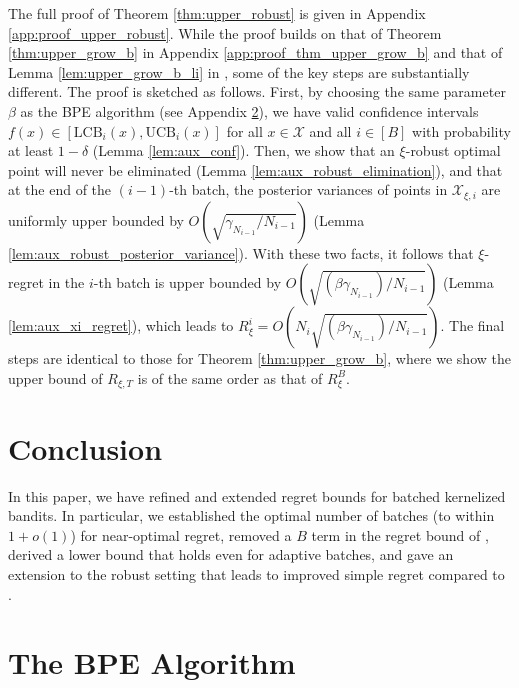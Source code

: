 \documentclass[10pt]{article}
\begin{document}
The full proof of Theorem \ref{thm:upper_robust} is given in Appendix \ref{app:proof_upper_robust}. While the proof builds on that of Theorem \ref{thm:upper_grow_b} in Appendix \ref{app:proof_thm_upper_grow_b} and that of Lemma \ref{lem:upper_grow_b_li} in \citep{Li22}, some of the key steps are substantially different.
The proof is sketched as follows.
First, by choosing the same parameter $\beta$ as the BPE algorithm (see Appendix \ref{app:bpe}),
we have valid confidence intervals $f(x)\in[\mathrm{LCB}_i(x),\mathrm{UCB}_i(x)]$ for all $x\in \mathcal{X}$ and all $i\in[B]$ with probability at least $1-\delta$ (Lemma \ref{lem:aux_conf}).
Then, we show that an $\xi$-robust optimal point will never be eliminated (Lemma \ref{lem:aux_robust_elimination}), and that at the end of the $(i-1)$-th batch, the posterior variances of points in $\mathcal{X}_{\xi, i}$ are uniformly upper bounded by $O(\sqrt{\gamma_{N_{i-1}}/N_{i-1}})$ (Lemma \ref{lem:aux_robust_posterior_variance}). 
With these two facts, it follows that $\xi$-regret in the $i$-th batch is upper bounded by $O(\sqrt{(\beta \gamma_{N_{i-1}})/ N_{i-1} } )$ (Lemma \ref{lem:aux_xi_regret}), which leads to $R_{\xi}^i= O (N_{i}\sqrt{(\beta \gamma_{N_{i-1}})/ N_{i-1} } ) $. 
The final steps are identical to those for Theorem \ref{thm:upper_grow_b}, where we show 
the upper bound of $R_{\xi,T}$ is of the same order as that of $R_{\xi}^B$.

\section{Conclusion}
In this paper, we have refined and extended regret bounds for batched kernelized bandits.  In particular, we established the optimal number of batches (to within $1+o(1)$) for near-optimal regret, removed a $B$ term in the regret bound of \citep{Li22}, derived a lower bound that holds even for adaptive batches, and gave an extension to the robust setting that leads to improved simple regret compared to \citep{Bogunovic18}.

\clearpage



\clearpage
\appendix
\section{The BPE Algorithm}
\label{app:bpe}
\end{document}
